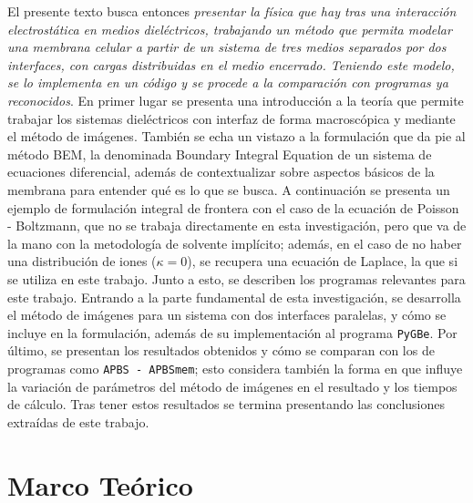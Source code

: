 \documentclass[12pt, oneside, numbers, spanish]{ezthesis}
\numberwithin{equation}{section}
\begin{document}
El presente texto busca entonces \textit{presentar la física que hay tras una interacción electrostática en medios dieléctricos, trabajando un método que permita modelar una membrana celular a partir de un sistema de tres medios separados por dos interfaces, con cargas distribuidas en el medio encerrado. Teniendo este modelo, se lo implementa en un código y se procede a la comparación con programas ya reconocidos}.
En primer lugar se presenta una introducción a la teoría que permite trabajar los sistemas dieléctricos con interfaz de forma macroscópica y mediante el método de imágenes. También se echa un vistazo a la formulación que da pie al método BEM, la denominada Boundary Integral Equation de un sistema de ecuaciones diferencial, además de contextualizar sobre aspectos básicos de la membrana para entender qué es lo que se busca. A continuación se presenta un ejemplo de formulación integral de frontera con el caso de la ecuación de Poisson - Boltzmann, que no se trabaja directamente en esta investigación, pero que va de la mano con la metodología de solvente implícito; además, en el caso de no haber una distribución de iones ($\kappa = 0$), se recupera una ecuación de Laplace, la que si se utiliza en este trabajo. Junto a esto, se describen los programas relevantes para este trabajo. Entrando a la parte fundamental de esta investigación, se desarrolla el método de imágenes para un sistema con dos interfaces paralelas, y cómo se incluye en la formulación, además de su implementación al programa \texttt{PyGBe}. Por último, se presentan los resultados obtenidos y cómo se comparan con los de programas como \texttt{APBS - APBSmem}; esto considera también la forma en que influye la variación de parámetros del método de imágenes en el resultado y los tiempos de cálculo. Tras tener estos resultados se termina presentando las conclusiones extraídas de este trabajo.




\chapter{Marco Teórico}\label{Chap:Teoria}
\end{document}
